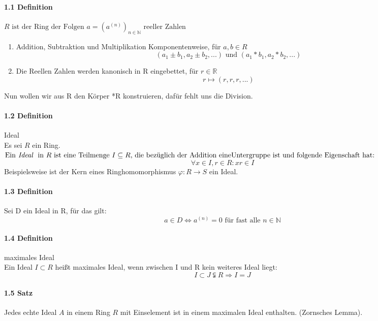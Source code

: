 \documentclass[a4paper]{article}
\begin{document}
\paragraph{1.1 Definition} $ R \text{ ist der Ring der Folgen }  a = (a^{(n)})_{n \in \mathbb{N}} \text{ reeller Zahlen} $
\begin{enumerate}
      \item Addition, Subtraktion und Multiplikation Komponentenweise, für $a, b \in R$  
            $$ (a_1 \pm b_1, a_2 \pm b_2,...) \text{ und } (a_1 * b_1, a_2 * b_2,...) $$ 
      \item Die Reellen Zahlen werden kanonisch in R eingebettet, für $ r \in \mathbb{R} $ 
            $$ r \mapsto (r,r,r,...) $$
\end{enumerate}
\smallskip
Nun wollen wir aus R den Körper *R konstruieren, dafür fehlt uns die Division. 

\paragraph{1.2 Definition} Ideal \\
Es sei $ R $ ein Ring. \\ 
$ \text{Ein} \textit{ Ideal } \text{ in } R \text{ ist eine Teilmenge } I \subseteq R \text{, die bezüglich der Addition 
eine} \\ \text{Untergruppe ist und folgende Eigenschaft hat:} $
$$ \forall x \in I, r \in R: xr \in I $$
Beispielsweise ist der Kern eines Ringhomomorphismus $ \varphi:R \to S $ ein Ideal. 


\paragraph{1.3 Definition} Sei D ein Ideal in R, für das gilt:  
      $$ a \in D \iff a^{(n)} = 0 \text{ für fast alle } n \in \mathbb{N}  $$

\paragraph{1.4 Definition} maximales Ideal \\
Ein Ideal $ I \subset R $ heißt maximales Ideal, wenn zwischen I und R kein weiteres Ideal liegt:
$$ I \subset J \subsetneqq R \Rightarrow I = J$$


\paragraph{1.5 Satz} Jedes echte Ideal $ A $ in einem Ring $ R $ mit Einselement ist in einem maximalen Ideal enthalten. (Zornsches Lemma).
\bigskip
\end{document}
